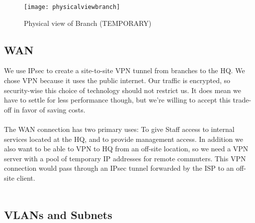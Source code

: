 \begin{figure}[H]
\caption{Physical view of Branch (TEMPORARY)}
\centering
\texttt{[image: physicalviewbranch]}
\label{physicalviewbranch}
\end{figure}


\subsection{WAN}

We use IPsec to create a site-to-site VPN tunnel from branches to the HQ. We chose VPN because it uses the public internet. Our traffic is encrypted, so security-wise this choice of technology should not restrict us. It does mean we have to settle for less performance though, but we're willing to accept this trade-off in favor of saving costs. 
\\
\\


The WAN connection has two primary uses: To give Staff access to internal services located at the HQ, and to provide management access. In addition we also want to be able to VPN to HQ from an off-site location, so we need a VPN server with a pool of temporary IP addresses for remote commuters. This VPN connection would pass through an IPsec tunnel forwarded by the ISP to an off-site client.
\\
\\


\subsection{VLANs and Subnets}


